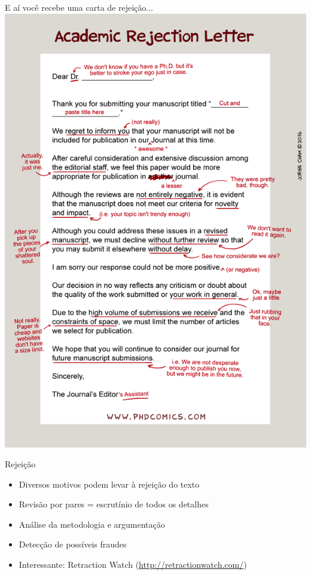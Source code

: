 \documentclass{beamer}
\begin{document}
\begin{frame}{E aí você recebe uma carta de rejeição...}
  \centering
  \includegraphics[height=\textheight]{Etapas/phd071316s}
\end{frame}

\begin{frame}{Rejeição}
  \begin{itemize}
    \footnotesize
  \item Diversos motivos podem levar à rejeição do texto
    \medskip
  \item Revisão por pares = escrutínio de todos os detalhes
    \medskip
  \item Análise da metodologia e argumentação
    \medskip
  \item Detecção de possíveis fraudes
    \medskip
  \item Interessante: Retraction Watch (\url{http://retractionwatch.com/})
  \end{itemize}
\end{frame}
\end{document}

